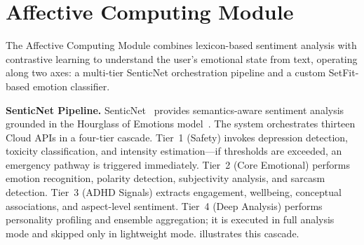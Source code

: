 \section{Affective Computing Module}
\label{sec:affective_computing}

The Affective Computing Module combines lexicon-based sentiment analysis with contrastive learning to understand the user's emotional state from text, operating along two axes: a multi-tier SenticNet orchestration pipeline and a custom SetFit-based emotion classifier.

\textbf{SenticNet Pipeline.} SenticNet~\cite{cambria2024} provides semantics-aware sentiment analysis grounded in the Hourglass of Emotions model~\cite{cambria2016}. The system orchestrates thirteen Cloud APIs in a four-tier cascade. Tier~1 (Safety) invokes depression detection, toxicity classification, and intensity estimation---if thresholds are exceeded, an emergency pathway is triggered immediately. Tier~2 (Core Emotional) performs emotion recognition, polarity detection, subjectivity analysis, and sarcasm detection. Tier~3 (ADHD Signals) extracts engagement, wellbeing, conceptual associations, and aspect-level sentiment. Tier~4 (Deep Analysis) performs personality profiling and ensemble aggregation; it is executed in full analysis mode and skipped only in lightweight mode.  illustrates this cascade.


